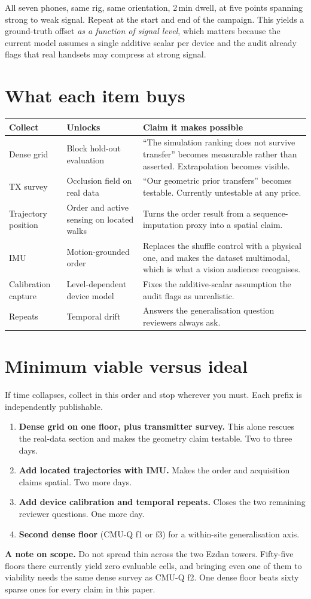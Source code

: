 \documentclass[10pt,a4paper]{article}
\begin{document}
All seven phones, same rig, same orientation, 2\,min dwell, at five points spanning
strong to weak signal. Repeat at the start and end of the campaign. This yields a
ground-truth offset \emph{as a function of signal level}, which matters because the
current model assumes a single additive scalar per device and the audit already flags
that real handsets may compress at strong signal.

\section{What each item buys}

\begin{center}\small
\begin{tabular}{@{}p{3.4cm}p{5.0cm}p{8.0cm}@{}}
\toprule
Collect & Unlocks & Claim it makes possible \\ \midrule
Dense grid & Block hold-out evaluation & ``The simulation ranking does not survive
transfer'' becomes measurable rather than asserted. Extrapolation becomes visible. \\
TX survey & Occlusion field on real data & ``Our geometric prior transfers'' becomes
testable. Currently untestable at any price. \\
Trajectory position & Order and active sensing on located walks & Turns the order result
from a sequence-imputation proxy into a spatial claim. \\
IMU & Motion-grounded order & Replaces the shuffle control with a physical one, and makes
the dataset multimodal, which is what a vision audience recognises. \\
Calibration capture & Level-dependent device model & Fixes the additive-scalar assumption
the audit flags as unrealistic. \\
Repeats & Temporal drift & Answers the generalisation question reviewers always ask. \\
\bottomrule
\end{tabular}
\end{center}

\section{Minimum viable versus ideal}

If time collapses, collect in this order and stop wherever you must. Each prefix is
independently publishable.

\begin{enumerate}
\item \textbf{Dense grid on one floor, plus transmitter survey.} This alone rescues the
real-data section and makes the geometry claim testable. Two to three days.
\item \textbf{Add located trajectories with IMU.} Makes the order and acquisition claims
spatial. Two more days.
\item \textbf{Add device calibration and temporal repeats.} Closes the two remaining
reviewer questions. One more day.
\item \textbf{Second dense floor} (CMU-Q f1 or f3) for a within-site generalisation axis.
\end{enumerate}

\textbf{A note on scope.} Do not spread thin across the two Ezdan towers. Fifty-five
floors there currently yield zero evaluable cells, and bringing even one of them to
viability needs the same dense survey as CMU-Q f2. One dense floor beats sixty sparse
ones for every claim in this paper.
\end{document}
